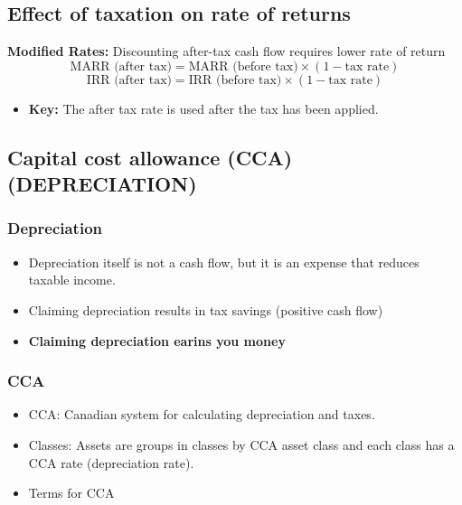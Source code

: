 \subsection{Effect of taxation on rate of returns}
\begin{definition} \textbf{Modified Rates:} Discounting after-tax cash flow requires lower rate of return
    \begin{equation}
        \text{MARR (after tax)} = \text{MARR (before tax)} \times (1 - \text{tax rate})
    \end{equation}
    \begin{equation}
        \text{IRR (after tax)} = \text{IRR (before tax)} \times (1 - \text{tax rate})
    \end{equation}
    \begin{itemize}
        \item \textbf{Key:} The after tax rate is used after the tax has been applied. 
    \end{itemize}
\end{definition}

\subsection{Capital cost allowance (CCA) (DEPRECIATION)}
\subsubsection{Depreciation}
\begin{intuition}
    \begin{itemize}
        \item Depreciation itself is not a cash flow, but it is an expense that reduces taxable income.
        \item Claiming depreciation results in tax savings (positive cash flow)
        \item \textbf{Claiming depreciation earins you money} 
    \end{itemize}
\end{intuition}

\subsubsection{CCA}
\begin{terminology}
    \begin{itemize}
        \item CCA: Canadian system for calculating depreciation and taxes.
        \item Classes: Assets are groups in classes by CCA asset class and each class has a CCA rate (depreciation rate).
        \item Terms for CCA
    \end{itemize}
\end{terminology}

